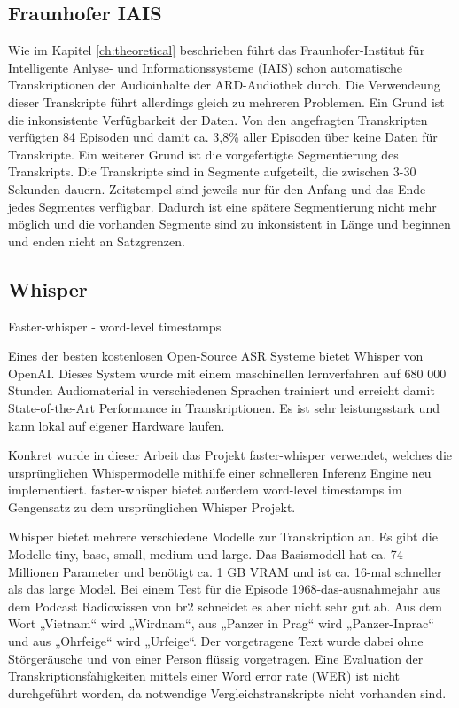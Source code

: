 \subsection{Fraunhofer IAIS}

Wie im Kapitel \autoref*{ch:theoretical} beschrieben führt das Fraunhofer-Institut für Intelligente Anlyse- und Informationssysteme (IAIS) schon automatische Transkriptionen der Audioinhalte der ARD-Audiothek durch.
Die Verwendeung dieser Transkripte führt allerdings gleich zu mehreren Problemen.
Ein Grund ist die inkonsistente Verfügbarkeit der Daten.
Von den angefragten Transkripten verfügten 84 Episoden und damit ca. 3,8\% aller Episoden über keine Daten für Transkripte.
Ein weiterer Grund ist die vorgefertigte Segmentierung des Transkripts.
Die Transkripte sind in Segmente aufgeteilt, die zwischen 3-30 Sekunden dauern.
Zeitstempel sind jeweils nur für den Anfang und das Ende jedes Segmentes verfügbar.
Dadurch ist eine spätere Segmentierung nicht mehr möglich und die vorhanden Segmente sind zu inkonsistent in Länge und beginnen und enden nicht an Satzgrenzen.




\subsection{Whisper}

Faster-whisper - word-level timestamps

Eines der besten kostenlosen Open-Source ASR Systeme bietet Whisper von OpenAI. 
Dieses System wurde mit einem maschinellen lernverfahren auf 680 000 Stunden Audiomaterial in verschiedenen Sprachen trainiert und erreicht damit State-of-the-Art Performance in Transkriptionen.
Es ist sehr leistungsstark und kann lokal auf eigener Hardware laufen. \cite{radford}

Konkret wurde in dieser Arbeit das Projekt faster-whisper \cite{faster-whisper2024} verwendet, welches die ursprünglichen Whispermodelle mithilfe einer schnelleren Inferenz Engine neu implementiert.
faster-whisper bietet außerdem word-level timestamps im Gengensatz zu dem ursprünglichen Whisper Projekt.

Whisper bietet mehrere verschiedene Modelle zur Transkription an. 
Es gibt die Modelle tiny, base, small, medium und large. 
Das Basismodell hat ca. 74 Millionen Parameter und benötigt ca. 1 GB VRAM und ist ca. 16-mal schneller als das large Model. 
Bei einem Test für die Episode 1968-das-ausnahmejahr aus dem Podcast Radiowissen von br2 schneidet es aber nicht sehr gut ab. 
Aus dem Wort „Vietnam“ wird „Wirdnam“, aus „Panzer in Prag“ wird „Panzer-Inprac“ und aus  „Ohrfeige“ wird „Urfeige“. 
Der vorgetragene Text wurde dabei ohne Störgeräusche und von einer Person flüssig vorgetragen. 
Eine Evaluation der Transkriptionsfähigkeiten mittels einer Word error rate (WER) ist nicht durchgeführt worden, da notwendige Vergleichstranskripte nicht vorhanden sind.

